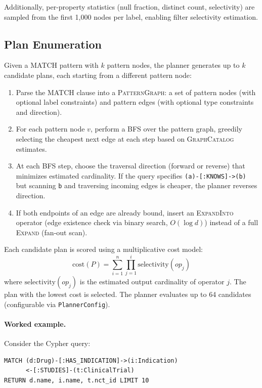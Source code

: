 \documentclass[sigconf, nonacm]{acmart}
\begin{document}
\noindent
Additionally, per-property statistics (null fraction, distinct count, selectivity) are sampled from the first 1,000 nodes per label, enabling filter selectivity estimation.

\subsection{Plan Enumeration}
\label{sec:enumeration}

Given a MATCH pattern with $k$ pattern nodes, the planner generates up to $k$ candidate plans, each starting from a different pattern node:

\begin{enumerate}[leftmargin=*]
  \item Parse the MATCH clause into a \textsc{PatternGraph}: a set of pattern nodes (with optional label constraints) and pattern edges (with optional type constraints and direction).
  \item For each pattern node $v$, perform a BFS over the pattern graph, greedily selecting the cheapest next edge at each step based on \textsc{GraphCatalog} estimates.
  \item At each BFS step, choose the traversal direction (forward or reverse) that minimizes estimated cardinality. If the query specifies \texttt{(a)-[:KNOWS]->(b)} but scanning \texttt{b} and traversing incoming edges is cheaper, the planner reverses direction.
  \item If both endpoints of an edge are already bound, insert an \textsc{ExpandInto} operator (edge existence check via binary search, $O(\log d)$) instead of a full \textsc{Expand} (fan-out scan).
\end{enumerate}

\noindent
Each candidate plan is scored using a multiplicative cost model:
\[
  \text{cost}(P) = \sum_{i=1}^{n} \prod_{j=1}^{i} \text{selectivity}(op_j)
\]
\noindent
where $\text{selectivity}(op_j)$ is the estimated output cardinality of operator $j$.
The plan with the lowest cost is selected.
The planner evaluates up to 64 candidates (configurable via \texttt{PlannerConfig}).

\paragraph{Worked example.}
Consider the Cypher query:

\begin{lstlisting}
MATCH (d:Drug)-[:HAS_INDICATION]->(i:Indication)
      <-[:STUDIES]-(t:ClinicalTrial)
RETURN d.name, i.name, t.nct_id LIMIT 10
\end{lstlisting}
\end{document}
